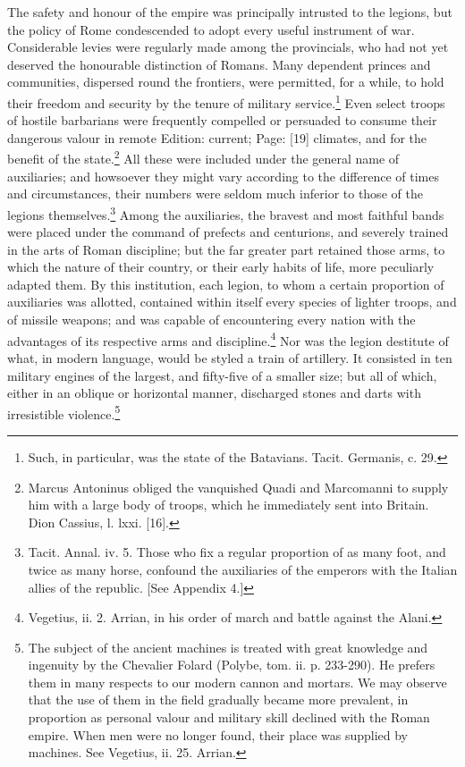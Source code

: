 The safety and honour of the empire was principally intrusted to the legions, but the policy of Rome condescended to adopt every useful instrument of war. Considerable levies were regularly made among the provincials, who had not yet deserved the honourable distinction of Romans. Many dependent princes and communities, dispersed round the frontiers, were permitted, for a while, to hold their freedom and security by the tenure of military service.\footnote{Such, in particular, was the state of the Batavians. Tacit. Germanis, c. 29.} Even select troops of hostile barbarians were frequently compelled or persuaded to consume their dangerous valour in remote Edition: current; Page: [19] climates, and for the benefit of the state.\footnote{Marcus Antoninus obliged the vanquished Quadi and Marcomanni to supply him with a large body of troops, which he immediately sent into Britain. Dion Cassius, l. lxxi. [16].} All these were included under the general name of auxiliaries; and howsoever they might vary according to the difference of times and circumstances, their numbers were seldom much inferior to those of the legions themselves.\footnote{Tacit. Annal. iv. 5. Those who fix a regular proportion of as many foot, and twice as many horse, confound the auxiliaries of the emperors with the Italian allies of the republic. [See Appendix 4.]} Among the auxiliaries, the bravest and most faithful bands were placed under the command of prefects and centurions, and severely trained in the arts of Roman discipline; but the far greater part retained those arms, to which the nature of their country, or their early habits of life, more peculiarly adapted them. By this institution, each legion, to whom a certain proportion of auxiliaries was allotted, contained within itself every species of lighter troops, and of missile weapons; and was capable of encountering every nation with the advantages of its respective arms and discipline.\footnote{Vegetius, ii. 2. Arrian, in his order of march and battle against the Alani.} Nor was the legion destitute of what, in modern language, would be styled a train of artillery. It consisted in ten military engines of the largest, and fifty-five of a smaller size; but all of which, either in an oblique or horizontal manner, discharged stones and darts with irresistible violence.\footnote{The subject of the ancient machines is treated with great knowledge and ingenuity by the Chevalier Folard (Polybe, tom. ii. p. 233-290). He prefers them in many respects to our modern cannon and mortars. We may observe that the use of them in the field gradually became more prevalent, in proportion as personal valour and military skill declined with the Roman empire. When men were no longer found, their place was supplied by machines. See Vegetius, ii. 25. Arrian.}

